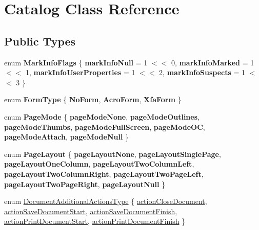 \hypertarget{class_catalog}{}\section{Catalog Class Reference}
\label{class_catalog}
\subsection*{Public Types}
\begin{DoxyCompactItemize}
\item 
\mbox{\label{class_catalog_a62d29a6b49f690ce7412d8a92a9a413a}} 
enum {\bfseries Mark\+Info\+Flags} \{ {\bfseries mark\+Info\+Null} = 1 $<$$<$ 0, 
{\bfseries mark\+Info\+Marked} = 1 $<$$<$ 1, 
{\bfseries mark\+Info\+User\+Properties} = 1 $<$$<$ 2, 
{\bfseries mark\+Info\+Suspects} = 1 $<$$<$ 3
 \}
\item 
\mbox{\label{class_catalog_a6892c8a9ff1dd981586cfc9bbf45c640}} 
enum {\bfseries Form\+Type} \{ {\bfseries No\+Form}, 
{\bfseries Acro\+Form}, 
{\bfseries Xfa\+Form}
 \}
\item 
\mbox{\label{class_catalog_aebb5dafdf6ebacd4d0ed10ec93b5d69c}} 
enum {\bfseries Page\+Mode} \{ \newline
{\bfseries page\+Mode\+None}, 
{\bfseries page\+Mode\+Outlines}, 
{\bfseries page\+Mode\+Thumbs}, 
{\bfseries page\+Mode\+Full\+Screen}, 
\newline
{\bfseries page\+Mode\+OC}, 
{\bfseries page\+Mode\+Attach}, 
{\bfseries page\+Mode\+Null}
 \}
\item 
\mbox{\label{class_catalog_aaf275073c64ef5ded901cfc0ca2dbccd}} 
enum {\bfseries Page\+Layout} \{ \newline
{\bfseries page\+Layout\+None}, 
{\bfseries page\+Layout\+Single\+Page}, 
{\bfseries page\+Layout\+One\+Column}, 
{\bfseries page\+Layout\+Two\+Column\+Left}, 
\newline
{\bfseries page\+Layout\+Two\+Column\+Right}, 
{\bfseries page\+Layout\+Two\+Page\+Left}, 
{\bfseries page\+Layout\+Two\+Page\+Right}, 
{\bfseries page\+Layout\+Null}
 \}
\item 
enum \hyperlink{class_catalog_acd1ae95dd8f85f0dae630c8904dcfb6e}{Document\+Additional\+Actions\+Type} \{ \newline
\hyperlink{class_catalog_acd1ae95dd8f85f0dae630c8904dcfb6ea400359f896a45f389cd519e1d16ddd04}{action\+Close\+Document}, 
\hyperlink{class_catalog_acd1ae95dd8f85f0dae630c8904dcfb6eacc48e6d7623b61d8a5ee4f20ae1ea52a}{action\+Save\+Document\+Start}, 
\hyperlink{class_catalog_acd1ae95dd8f85f0dae630c8904dcfb6ea2e5899ea62f07b5153060f3216cf4adc}{action\+Save\+Document\+Finish}, 
\hyperlink{class_catalog_acd1ae95dd8f85f0dae630c8904dcfb6ea96ae19db5be23faa8eafd57b139cb337}{action\+Print\+Document\+Start}, 
\newline
\hyperlink{class_catalog_acd1ae95dd8f85f0dae630c8904dcfb6eaf4d1ee724bdb0fee3e99dd3720e304b1}{action\+Print\+Document\+Finish}
 \}
\end{DoxyCompactItemize}
